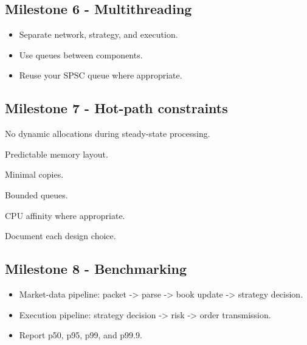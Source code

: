 \documentclass[11pt,letterpaper]{article}
\begin{document}
\subsection*{Milestone 6 - Multithreading}

\begin{itemize}

\item Separate network, strategy, and execution.

\item Use queues between components.

\item Reuse your SPSC queue where appropriate.

\end{itemize}

\subsection*{Milestone 7 - Hot-path constraints}

\begin{topics}

\item No dynamic allocations during steady-state processing.

\item Predictable memory layout.

\item Minimal copies.

\item Bounded queues.

\item CPU affinity where appropriate.

\item Document each design choice.

\end{topics}

\subsection*{Milestone 8 - Benchmarking}

\begin{itemize}

\item Market-data pipeline: packet -> parse -> book update -> strategy decision.

\item Execution pipeline: strategy decision -> risk -> order transmission.

\item Report p50, p95, p99, and p99.9.

\end{itemize}
\end{document}

